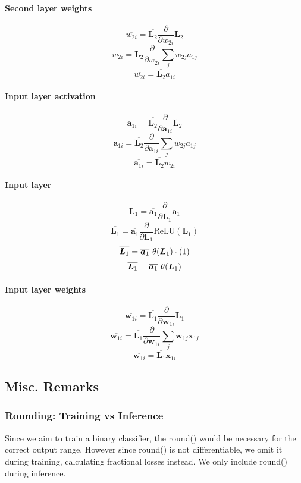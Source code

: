 \documentclass{article}
\begin{document}
\paragraph{Second layer weights}
\[\overline{w_{2i}} = \overline{\bm{L}_2} \frac{\partial}{\partial{w_{2i}}} \bm{L}_2 \]
\[\overline{w_{2i}} = \overline{\bm{L}_2} \frac{\partial}{\partial{w_{2i}}} \sum_{j} w_{2j}a_{1j} \]
\begin{equation}
    \overline{w_{2i}} = \overline{\bm{L}_2} a_{1i}
\end{equation}
\paragraph{Input layer activation}
\[\overline{\bm{a}_{1i}} = \overline{\bm{L}_2} \frac{\partial}{\partial{\bm{a}_{1i}}} \bm{L}_2\]
\[\overline{\bm{a}_{1i}} = \overline{\bm{L}_2} \frac{\partial}{\partial{\bm{a}_{1i}}} \sum_{j} w_{2j}a_{1j}\]
\begin{equation}
    \overline{\bm{a}_{1i}} = \overline{\bm{L}_2} w_{2i}
\end{equation}
\paragraph{Input layer}
\[\overline{\bm{L}_1} = \overline{\bm{a}_1} \frac{\partial}{\partial{\bm{L}_1}} \bm{a}_1\]
\[\overline{\bm{L}_1} = \overline{\bm{a}_1} \frac{\partial}{\partial{\bm{L}_1}} \text{ReLU}(\bm{L}_1)\]
\[\overline{\bm{L}_1} = \overline{\bm{a}_1} \hspace{0.125cm} \theta(\bm{L}_1) \cdot (1)\]
\begin{equation}
    \overline{\bm{L}_1} = \overline{\bm{a}_1} \hspace{0.125cm} \theta(\bm{L}_1)
\end{equation}
\paragraph{Input layer weights}
\[\overline{\bm{w}_{1i}} = \overline{\bm{L}_1} \frac{\partial}{\partial{\bm{w}_{1i}}} \bm{L}_1\]
\[\overline{\bm{w}_{1i}} = \overline{\bm{L}_1} \frac{\partial}{\partial{\bm{w}_{1i}}} \sum_{j} \bm{w}_{1j}\bm{x}_{1j}\]
\begin{equation}
    \overline{\bm{w}_{1i}} = \overline{\bm{L}_1} \bm{x}_{1i}
\end{equation}

\subsection{Misc. Remarks}
\subsubsection{Rounding: Training vs Inference} Since we aim to train a binary classifier, the round() would be necessary for the correct output range. However since round() is not differentiable, we omit it during training, calculating fractional losses instead. We only include round() during inference.
\end{document}
